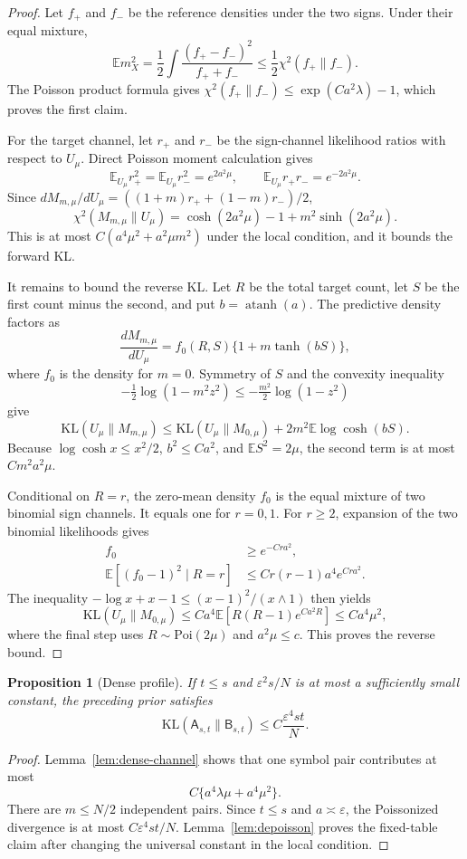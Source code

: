 \documentclass{article}
\newtheorem{proposition}[theorem]{Proposition}
\newcommand{\E}{\mathbb E}
\newcommand{\KL}{\mathrm{KL}}
\newcommand{\Poi}{\mathrm{Poi}}
\newcommand{\cA}{\mathsf A}
\newcommand{\cB}{\mathsf B}
\begin{document}
\begin{proof}
Let $f_+$ and $f_-$ be the reference densities under the two signs. Under their equal mixture,
\[
\E m_X^2=\frac12\int\frac{(f_+-f_-)^2}{f_++f_-}
\leq\frac12\chi^2(f_+\|f_-).
\]
The Poisson product formula gives $\chi^2(f_+\|f_-)\leq\exp(Ca^2\lambda)-1$, which proves the first claim.

For the target channel, let $r_+$ and $r_-$ be the sign-channel likelihood ratios with respect to $U_\mu$. Direct Poisson moment calculation gives
\[
\E_{U_\mu}r_+^2=\E_{U_\mu}r_-^2=e^{2a^2\mu},\qquad
\E_{U_\mu}r_+r_-=e^{-2a^2\mu}.
\]
Since $dM_{m,\mu}/dU_\mu=((1+m)r_++(1-m)r_-)/2$,
\[
\chi^2(M_{m,\mu}\|U_\mu)
=\cosh(2a^2\mu)-1+m^2\sinh(2a^2\mu).
\]
This is at most $C(a^4\mu^2+a^2\mu m^2)$ under the local condition, and it bounds the forward KL.

It remains to bound the reverse KL. Let $R$ be the total target count, let $S$ be the first count minus the second, and put $b=\operatorname{atanh}(a)$. The predictive density factors as
\[
\frac{dM_{m,\mu}}{dU_\mu}=f_0(R,S)\{1+m\tanh(bS)\},
\]
where $f_0$ is the density for $m=0$. Symmetry of $S$ and the convexity inequality
\[
-\tfrac12\log(1-m^2z^2)\leq -\tfrac{m^2}{2}\log(1-z^2)
\]
give
\[
\KL(U_\mu\|M_{m,\mu})
\leq\KL(U_\mu\|M_{0,\mu})+2m^2\E\log\cosh(bS).
\]
Because $\log\cosh x\leq x^2/2$, $b^2\leq Ca^2$, and $\E S^2=2\mu$, the second term is at most $Cm^2a^2\mu$.

Conditional on $R=r$, the zero-mean density $f_0$ is the equal mixture of two binomial sign channels. It equals one for $r=0,1$. For $r\geq2$, expansion of the two binomial likelihoods gives
\begin{align*}
f_0&\geq e^{-Cra^2},\\
\E[(f_0-1)^2\mid R=r]&\leq Cr(r-1)a^4e^{Cra^2}.
\end{align*}
The inequality $-\log x+x-1\leq(x-1)^2/(x\wedge1)$ then yields
\[
\KL(U_\mu\|M_{0,\mu})
\leq Ca^4\E[R(R-1)e^{Ca^2R}]
\leq Ca^4\mu^2,
\]
where the final step uses $R\sim\Poi(2\mu)$ and $a^2\mu\leq c$. This proves the reverse bound.
\end{proof}

\begin{proposition}[Dense profile]
\label{prop:dense-profile}
If $t\leq s$ and $\varepsilon^2s/N$ is at most a sufficiently small constant, the preceding prior satisfies
\[
\KL(\cA_{s,t}\|\cB_{s,t})\leq C\frac{\varepsilon^4st}{N}.
\]
\end{proposition}

\begin{proof}
Lemma~\ref{lem:dense-channel} shows that one symbol pair contributes at most
\[
C\{a^4\lambda\mu+a^4\mu^2\}.
\]
There are $m\leq N/2$ independent pairs. Since $t\leq s$ and $a\asymp\varepsilon$, the Poissonized divergence is at most $C\varepsilon^4st/N$. Lemma~\ref{lem:depoisson} proves the fixed-table claim after changing the universal constant in the local condition.
\end{proof}
\end{document}
